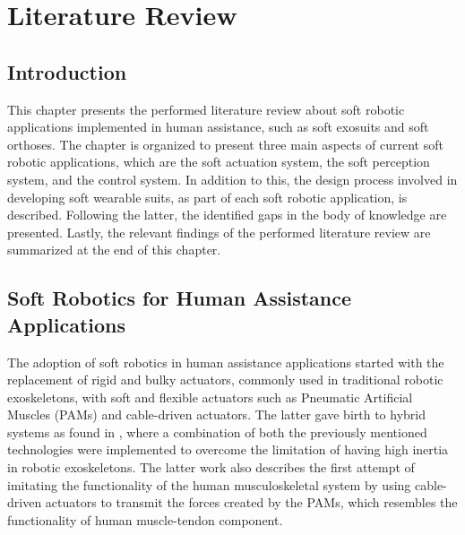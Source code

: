 \chapter{Literature Review} \label{ch2:Literature}

\section{Introduction}

This chapter presents the performed literature review about soft robotic applications implemented in human assistance, such as soft exosuits and soft orthoses. The chapter is organized to present three main aspects of current soft robotic applications, which are the soft actuation system, the soft perception system, and the control system. In addition to this, the design process involved in developing soft wearable suits, as part of each soft robotic application, is described. Following the latter, the identified gaps in the body of knowledge are presented. Lastly, the relevant findings of the performed literature review are summarized at the end of this chapter.

\section{Soft Robotics for Human Assistance Applications}

The adoption of soft robotics in human assistance applications started with the replacement of rigid and bulky actuators, commonly used in traditional robotic exoskeletons, with soft and flexible actuators such as Pneumatic Artificial Muscles (PAMs) and cable-driven actuators. The latter gave birth to hybrid systems as found in \cite{Noda2014}, where a combination of both the previously mentioned technologies were implemented to overcome the limitation of having high inertia in robotic exoskeletons. The latter work also describes the first attempt of imitating the functionality of the human musculoskeletal system by using cable-driven actuators to transmit the forces created by the PAMs, which resembles the functionality of human muscle-tendon component.

